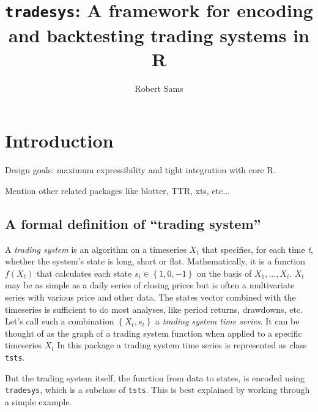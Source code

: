 \documentclass[a4]{article}
\newcommand{\code}[1]{\texttt{#1}}
\begin{document}
\author{Robert Sams}
\title{\code{tradesys}: A framework for encoding and backtesting trading systems in R}
\maketitle



\section{Introduction} \label{sec:intro}
Design goals: maximum expressibility and tight integration with core R.

Mention other related packages like blotter, TTR, xts, etc...

\subsection{A formal definition of ``trading system''}
A \emph{trading system} is an algorithm on a timeseries $X_{t}$ that
specifies, for each time \emph{t}, whether the system's state is long,
short or flat. Mathematically, it is a function $f(X_{t})$ that
calculates each state $s_{i} \in \left\{1,0,-1\right\}$ on the basis
of $X_{1}, ..., X_{i}$. $X_{t}$ may be as simple as a daily series of
closing prices but is often a multivariate series with various price
and other data. The states vector combined with the timeseries is
sufficient to do most analyses, like period returns, drawdowns,
etc. Let's call such a combination $\left\{X_{t}, s_{t}\right\}$ a
\emph{trading system time series}. It can be thought of as the graph
of a trading system function when applied to a specific timeseries
$X_{t}$ In this package a trading system time series is represented as
class \code{tsts}.

But the trading system itself, the function from data to states, is
encoded using \code{tradesys}, which is a subclass of
\code{tsts}. This is best explained by working through a simple
example.
\end{document}
